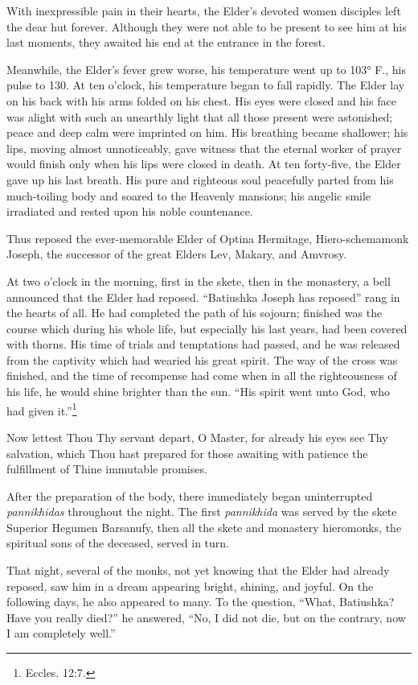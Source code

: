 With inexpressible pain in their hearts, the Elder's devoted women disciples left the dear hut forever. Although they were not able to be present to see him at his last moments, they awaited his end at the entrance in the forest.

Meanwhile, the Elder's fever grew worse, his temperature went up to 103° F., his pulse to 130. At ten o'clock, his temperature began to fall rapidly. The Elder lay on his back with his arms folded on his chest. His eyes were closed and his face was alight with such an unearthly light that all those present were astonished; peace and deep calm were imprinted on him. His breathing became shallower; his lips, moving almost unnoticeably, gave witness that the eternal worker of prayer would finish only when his lips were closed in death. At ten forty-five, the Elder gave up his last breath. His pure and righteous soul peacefully parted from his much-toiling body and soared to the Heavenly mansions; his angelic smile irradiated and rested upon his noble countenance.

Thus reposed the ever-memorable Elder of Optina Hermitage, Hiero-schemamonk Joseph, the successor of the great Elders Lev, Makary, and Amvrosy.

At two o'clock in the morning, first in the skete, then in the monastery, a bell announced that the Elder had reposed. “Batiushka Joseph has reposed” rang in the hearts of all. He had completed the path of his sojourn; finished was the course which during his whole life, but especially his last years, had been covered with thorns. His time of trials and temptations had passed, and he was released from the captivity which had wearied his great spirit. The way of the cross was finished, and the time of recompense had come when in all the righteousness of his life, he would shine brighter than the sun. “His spirit went unto God, who had given it.''\footnote{Eccles. 12:7.}

Now lettest Thou Thy servant depart, O Master, for already his eyes see Thy salvation, which Thou hast prepared for those awaiting with patience the fulfillment of Thine immutable promises.

After the preparation of the body, there immediately began uninterrupted \textit{pannikhidas} throughout the night. The first \textit{pannikhida} was served by the skete Superior Hegumen Barsanufy, then all the skete and monastery hieromonks, the spiritual sons of the deceased, served in turn.

That night, several of the monks, not yet knowing that the Elder had already reposed, saw him in a dream appearing bright, shining, and joyful. On the following days, he also appeared to many. To the question, “What, Batiushka? Have you really died?” he answered, “No, I did not die, but on the contrary, now I am completely well.”

